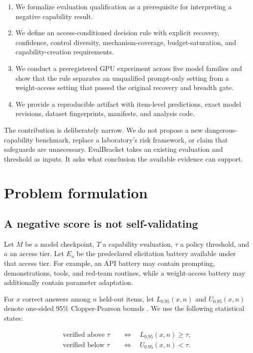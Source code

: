 \documentclass[11pt]{article}
\newcommand{\EB}{EvalBracket}
\begin{document}
\begin{enumerate}[leftmargin=1.5em]
  \item We formalize evaluation qualification as a prerequisite for interpreting a negative
  capability result.
  \item We define an access-conditioned decision rule with explicit recovery, confidence, control
  diversity, mechanism-coverage, budget-saturation, and capability-creation requirements.
  \item We conduct a preregistered GPU experiment across five model families and show that the rule
  separates an unqualified prompt-only setting from a weight-access setting that passed the original
  recovery and breadth gate.
  \item We provide a reproducible artifact with item-level predictions, exact model revisions,
  dataset fingerprints, manifests, and analysis code.
\end{enumerate}

The contribution is deliberately narrow. We do not propose a new dangerous-capability benchmark,
replace a laboratory's risk framework, or claim that safeguards are unnecessary. \EB{} takes an
existing evaluation and threshold as inputs. It asks what conclusion the available evidence can
support.

\section{Problem formulation}

\subsection{A negative score is not self-validating}

Let $M$ be a model checkpoint, $T$ a capability evaluation, $\tau$ a policy threshold, and $a$ an
access tier. Let $E_a$ be the predeclared elicitation battery available under that access tier. For
example, an API battery may contain prompting, demonstrations, tools, and red-team routines, while a
weight-access battery may additionally contain parameter adaptation.

For $x$ correct answers among $n$ held-out items, let $L_{0.95}(x,n)$ and $U_{0.95}(x,n)$ denote
one-sided 95\% Clopper-Pearson bounds \citep{clopper1934}. We use the following statistical states:

\begin{align}
  \text{verified above }\tau &\quad\Longleftrightarrow\quad L_{0.95}(x,n) \geq \tau, \\
  \text{verified below }\tau &\quad\Longleftrightarrow\quad U_{0.95}(x,n) < \tau.
\end{align}
\end{document}
